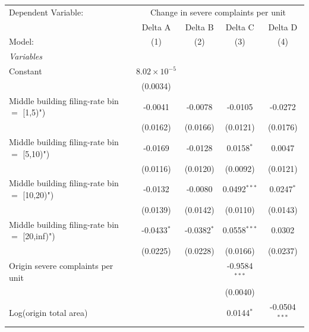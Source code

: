 \begingroup
\centering
\begin{tabular}{lcccc}
   \tabularnewline \midrule \midrule
   Dependent Variable: & \multicolumn{4}{c}{Change in severe complaints per unit}\\
                                                  & Delta A               & Delta B       & Delta C         & Delta D \\   
   Model:                                         & (1)                   & (2)           & (3)             & (4)\\  
   \midrule
   \emph{Variables}\\
   Constant                                       & $8.02\times 10^{-5}$  &               &                 &   \\   
                                                  & (0.0034)              &               &                 &   \\   
   Middle building filing-rate bin $=$ [1,5)")    & -0.0041               & -0.0078       & -0.0105         & -0.0272\\   
                                                  & (0.0162)              & (0.0166)      & (0.0121)        & (0.0176)\\   
   Middle building filing-rate bin $=$ [5,10)")   & -0.0169               & -0.0128       & 0.0158$^{*}$    & 0.0047\\   
                                                  & (0.0116)              & (0.0120)      & (0.0092)        & (0.0121)\\   
   Middle building filing-rate bin $=$ [10,20)")  & -0.0132               & -0.0080       & 0.0492$^{***}$  & 0.0247$^{*}$\\   
                                                  & (0.0139)              & (0.0142)      & (0.0110)        & (0.0143)\\   
   Middle building filing-rate bin $=$ [20,inf)") & -0.0433$^{*}$         & -0.0382$^{*}$ & 0.0558$^{***}$  & 0.0302\\   
                                                  & (0.0225)              & (0.0228)      & (0.0166)        & (0.0237)\\   
   Origin severe complaints per unit              &                       &               & -0.9584$^{***}$ &   \\   
                                                  &                       &               & (0.0040)        &   \\   
   Log(origin total area)                         &                       &               & 0.0144$^{*}$    & -0.0504$^{***}$\\   

\end{tabular}

